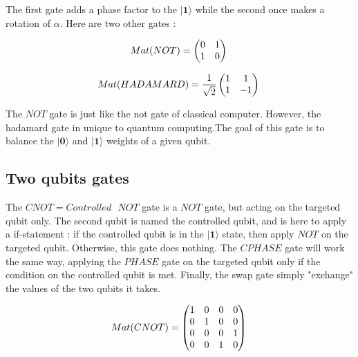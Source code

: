 \documentclass[a4paper,12pt]{report}
\newcommand{\quSt}[1]{\bm{|#1\rangle}}
\begin{document}
\vspace{1\baselineskip}

\par{
	The first gate adds a phase factor to the $\quSt{1}$ while the second once makes a rotation of $\alpha$. Here are two other gates :
}

\begin{equation}
	 Mat(NOT) = \left( \begin{matrix} 0 & 1 \\ 1 & 0 \end{matrix} \right ) \\
\end{equation}

\begin{equation}
	 Mat(HADAMARD) = \frac{1}{\sqrt{2}} \left( \begin{matrix} 1 & 1 \\ 1 & -1 \end{matrix} \right ) \\
\end{equation}

\vspace{1\baselineskip}

\par{
	The $NOT$ gate is just like the not gate of classical computer. However, the hadamard gate in unique to quantum computing.The goal of this gate is to balance the $\quSt{0}$ and $\quSt{1}$ weights of a given qubit.
}

        \subsection{Two qubits gates}

\par{
	The $CNOT = Controlled \text{ } NOT$ gate is a $NOT$ gate, but acting on the targeted qubit only. The second qubit is named the controlled qubit, and is here to apply a if-statement : if the controlled qubit is in the $\quSt{1}$ state, then apply $NOT$ on the targeted qubit. Otherwise, this gate does nothing. The $CPHASE$ gate will work the same way, applying the $PHASE$ gate on the targeted qubit only if the condition on the controlled qubit is met. Finally, the swap gate simply "exchange" the values of the two qubits it takes.
}

\begin{equation}
	 Mat(CNOT) = \left( \begin{matrix} 1 & 0 & 0 & 0 \\ 0 & 1 & 0 & 0 \\ 0 & 0 & 0 & 1 \\ 0 & 0 & 1 & 0 \\ \end{matrix} \right ) \\
\end{equation}
\end{document}
